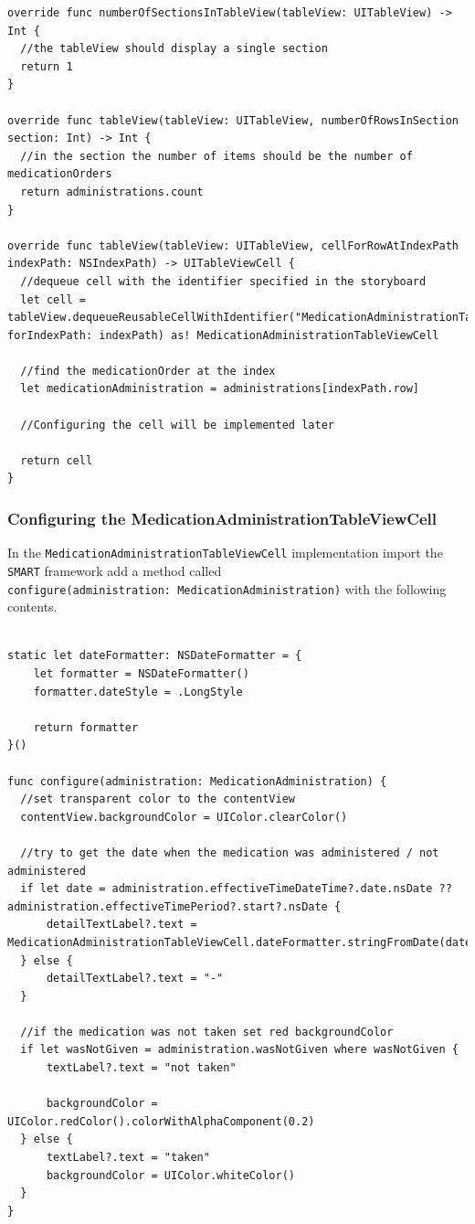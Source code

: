 \documentclass{article}
\begin{document}
\begin{verbatim}
override func numberOfSectionsInTableView(tableView: UITableView) -> Int {
  //the tableView should display a single section
  return 1
}

override func tableView(tableView: UITableView, numberOfRowsInSection section: Int) -> Int {
  //in the section the number of items should be the number of medicationOrders
  return administrations.count
}

override func tableView(tableView: UITableView, cellForRowAtIndexPath indexPath: NSIndexPath) -> UITableViewCell {
  //dequeue cell with the identifier specified in the storyboard
  let cell = tableView.dequeueReusableCellWithIdentifier("MedicationAdministrationTableViewCell", forIndexPath: indexPath) as! MedicationAdministrationTableViewCell

  //find the medicationOrder at the index
  let medicationAdministration = administrations[indexPath.row]

  //Configuring the cell will be implemented later

  return cell
}
\end{verbatim}

\subsubsection{Configuring the MedicationAdministrationTableViewCell}\label{configure-the-medicationadministrationtableviewcell}

In the \texttt{MedicationAdministrationTableViewCell} implementation
import the \texttt{SMART} framework add a method called
\texttt{configure(administration:\ MedicationAdministration)} with the
following contents.

\begin{verbatim}

static let dateFormatter: NSDateFormatter = {
    let formatter = NSDateFormatter()
    formatter.dateStyle = .LongStyle

    return formatter
}()

func configure(administration: MedicationAdministration) {
  //set transparent color to the contentView
  contentView.backgroundColor = UIColor.clearColor()

  //try to get the date when the medication was administered / not administered
  if let date = administration.effectiveTimeDateTime?.date.nsDate ?? administration.effectiveTimePeriod?.start?.nsDate {
      detailTextLabel?.text = MedicationAdministrationTableViewCell.dateFormatter.stringFromDate(date)
  } else {
      detailTextLabel?.text = "-"
  }

  //if the medication was not taken set red backgroundColor
  if let wasNotGiven = administration.wasNotGiven where wasNotGiven {
      textLabel?.text = "not taken"

      backgroundColor = UIColor.redColor().colorWithAlphaComponent(0.2)
  } else {
      textLabel?.text = "taken"
      backgroundColor = UIColor.whiteColor()
  }
}
\end{verbatim}
\end{document}
